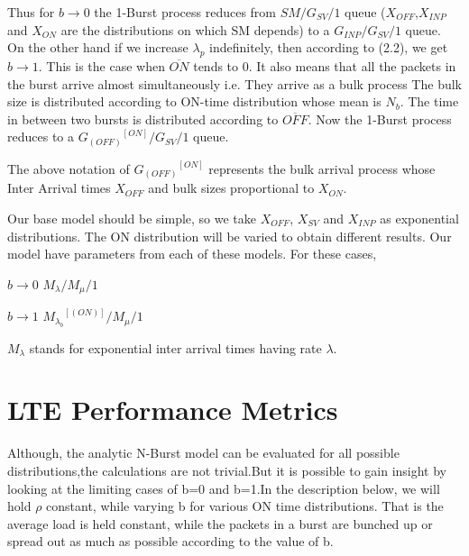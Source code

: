 Thus for $b\rightarrow 0 $ the 1-Burst process reduces from $SM/G_{SV}/1$ queue ($X_{OFF}$,$X_{INP}$ and $X_{ON}$ are the distributions on which SM depends) to a $G_{INP}/G_{SV}/1$ queue.\\
On the other hand if we increase $\lambda_{p}$ indefinitely, then according to (2.2), we get $b\rightarrow 1$. This is the case when $\overline{ON}$ tends to 0. It also means that all the packets in the burst arrive almost simultaneously i.e.  They arrive as a bulk process The bulk size is distributed according to ON-time distribution whose mean is $N_{b}$. The time in between two bursts is distributed according to $\overline{OFF}$. Now the 1-Burst process reduces to a ${G_{(OFF)}}^{[ON]}/G_{SV}/1$ queue.\\
\begin{remark}
The above notation of ${G_{(OFF)}}^{[ON]}$ represents the bulk arrival process whose Inter Arrival times $X_{OFF}$ and bulk sizes proportional to $X_{ON}$.
\end{remark}

Our base model should be simple, so we take $X_{OFF}$, $X_{SV}$ and $X_{INP}$ as exponential distributions. The ON distribution will be varied to obtain different results. Our model have parameters from each of these models. For these cases,
\begin{center}
$b\rightarrow 0$  $M_{\lambda}/M_{\mu}/1$ 
\end{center}

\begin{center}
$b\rightarrow 1$  ${M_{\lambda_{b}}}^{[(ON)]}/M_{\mu}/1$ 
\end{center}

\begin{remark}
$M_{\lambda}$ stands for exponential inter arrival times having rate $\lambda$.
\end{remark}

\section{LTE Performance Metrics}

\begin{remark}
Although, the analytic N-Burst model can be evaluated for all possible distributions,the calculations are not trivial.But it is possible to gain insight by looking at the limiting cases of b=0 and b=1.In the description below, we will hold $\rho$ constant, while varying b for various ON time distributions. That is the average load is held constant, while the packets in a burst are bunched up or spread out as much as possible according to the value of b.\\
\end{remark}

